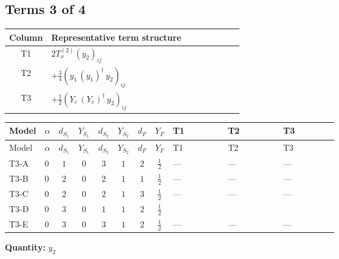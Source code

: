 \documentclass[8pt]{article}
\begin{document}
\begin{landscape}
\subsection*{Terms 3 of 4}
\begin{center}
\begin{tabular}{@{}c >{\raggedright\arraybackslash}p{0.82\linewidth}@{}}
\toprule
Column & Representative term structure \\
\midrule
T1 & \(\displaystyle 2 T_{\nu}^{(2)} \left({y_2}\right)_{ij}\) \\
\midrule
T2 & \(\displaystyle +\frac{3}{4} \left({y_1}\,\left({y_1}\right)^{\dagger}\,{y_2}\right)_{ij}\) \\
\midrule
T3 & \(\displaystyle +\frac{1}{2} \left({Y_e}\,\left({Y_e}\right)^{\dagger}\,{y_2}\right)_{ij}\) \\
\midrule
\bottomrule
\end{tabular}
\end{center}
\smallskip
\tiny
\begin{longtable}{@{}llcccccc >{\raggedright\arraybackslash}p{0.21\linewidth} >{\raggedright\arraybackslash}p{0.21\linewidth} >{\raggedright\arraybackslash}p{0.21\linewidth}@{}}
\toprule
Model & $\alpha$ & $d_{S_1}$ & $Y_{S_1}$ & $d_{S_2}$ & $Y_{S_2}$ & $d_F$ & $Y_F$ & T1 & T2 & T3 \\
\midrule
\endfirsthead
\toprule
Model & $\alpha$ & $d_{S_1}$ & $Y_{S_1}$ & $d_{S_2}$ & $Y_{S_2}$ & $d_F$ & $Y_F$ & T1 & T2 & T3 \\
\midrule
\endhead
T3-A & $0$ & $1$ & $0$ & $3$ & $1$ & $2$ & $\frac{1}{2}$ & --- & --- & --- \\
\midrule
T3-B & $0$ & $2$ & $0$ & $2$ & $1$ & $1$ & $\frac{1}{2}$ & --- & --- & --- \\
\midrule
T3-C & $0$ & $2$ & $0$ & $2$ & $1$ & $3$ & $\frac{1}{2}$ & --- & --- & --- \\
\midrule
T3-D & $0$ & $3$ & $0$ & $1$ & $1$ & $2$ & $\frac{1}{2}$ & \scriptsize\adjustbox{max width=\linewidth}{$\begin{gathered} 2 T_{\nu}^{(2)} \left({y_2}\right)_{ij}\end{gathered}$} & \scriptsize\adjustbox{max width=\linewidth}{$\begin{gathered} +\frac{3}{4} \left({y_1}\,\left({y_1}\right)^{\dagger}\,{y_2}\right)_{ij}\end{gathered}$} & \scriptsize\adjustbox{max width=\linewidth}{$\begin{gathered} +\frac{1}{2} \left({Y_e}\,\left({Y_e}\right)^{\dagger}\,{y_2}\right)_{ij}\end{gathered}$} \\
\midrule
T3-E & $0$ & $3$ & $0$ & $3$ & $1$ & $2$ & $\frac{1}{2}$ & --- & --- & --- \\
\midrule
\bottomrule
\end{longtable}
\clearpage
\noindent\textbf{Quantity: }$y_2$\par\smallskip

\end{landscape}
\end{document}
